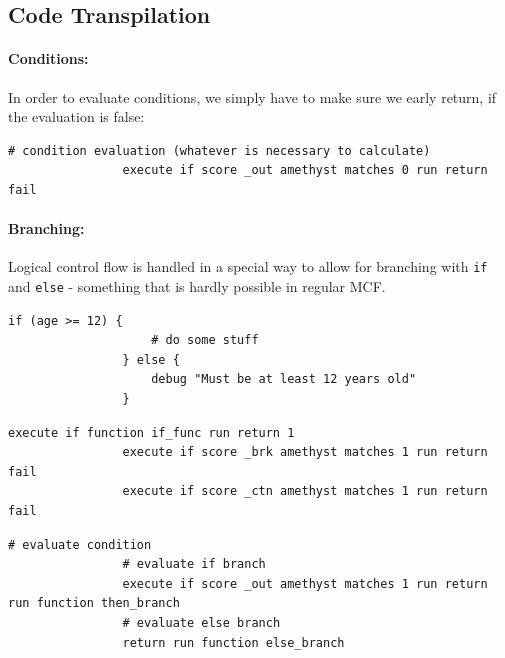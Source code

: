 \documentclass[12pt]{article}
\begin{document}
    \subsection{Code Transpilation}
        \paragraph{Conditions:}
            In order to evaluate conditions, we simply have to make sure we early return, if the evaluation is false:
            
            \begin{lstlisting}[language=Mcfunction]
                # condition evaluation (whatever is necessary to calculate)
                execute if score _out amethyst matches 0 run return fail
            \end{lstlisting}
        
        \paragraph{Branching:}
            Logical control flow is handled in a special way to allow for branching with \lstinline{if} and \lstinline{else} - something that is hardly possible in regular MCF.
            
            \begin{lstlisting}[language=Amethyst,title=Language Reference]
                if (age >= 12) {
                    # do some stuff
                } else {
                    debug "Must be at least 12 years old"
                }
            \end{lstlisting}
            
            \begin{lstlisting}[language=Mcfunction,title=calling.mcfunction]
                execute if function if_func run return 1
                execute if score _brk amethyst matches 1 run return fail
                execute if score _ctn amethyst matches 1 run return fail
            \end{lstlisting}
              
            \begin{lstlisting}[language=Mcfunction,title=if.mcfunction]
                # evaluate condition
                # evaluate if branch
                execute if score _out amethyst matches 1 run return run function then_branch
                # evaluate else branch
                return run function else_branch
            \end{lstlisting}
    
\end{document}
